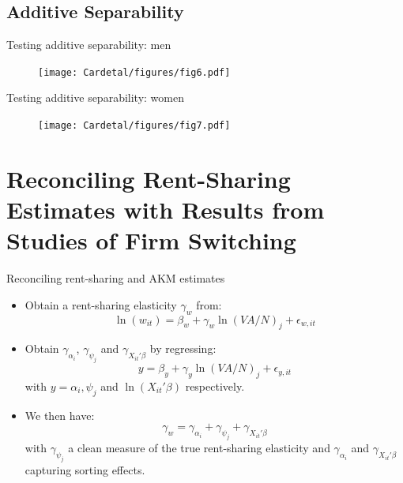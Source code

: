 \documentclass[notes=show]{beamer}
\begin{document}
\subsection*{Additive Separability}

\newpage
\begin{frame}{Testing additive separability: men}
\begin{center}
\begin{figure}
\texttt{[image: Cardetal/figures/fig6.pdf]}
\end{figure} 
\end{center}
\end{frame}

\newpage
\begin{frame}{Testing additive separability: women}
\begin{center}
\begin{figure}
\texttt{[image: Cardetal/figures/fig7.pdf]}
\end{figure} 
\end{center}
\end{frame}

\section{Reconciling Rent-Sharing Estimates with Results from Studies of Firm Switching}

\begin{frame}{Reconciling rent-sharing and AKM estimates}
\begin{itemize}
\item Obtain a rent-sharing elasticity $ \gamma_{w} $ from:
\begin{equation*}
    \ln(w_{it}) = \beta_{w} + \gamma_{w} \ln(VA/N)_{j} + \epsilon_{w,it}
\end{equation*}
\item Obtain $\gamma_{\alpha_{i}}$, $\gamma_{\psi_{j}}$ and $\gamma_{X_{it}' \beta}$ by regressing:
\begin{equation*}
    y = \beta_{y} + \gamma_{y} \ln(VA/N)_{j}  + \epsilon_{y,it}
\end{equation*}
with $y = \alpha_{i}, \psi_{j}$ and $\ln(X_{it}' \beta)$ respectively. \medskip
\item We then have:
\begin{equation*}
    \gamma_{w} = \gamma_{\alpha_{i}} + \gamma_{\psi_{j}} + \gamma_{X_{it}' \beta}  
\end{equation*}
with $ \gamma_{\psi_{j}}$ a clean measure of the true rent-sharing elasticity and $\gamma_{\alpha_{i}} $ and $\gamma_{X_{it}' \beta} $ capturing sorting effects.
\end{itemize}
\end{frame}
\end{document}

